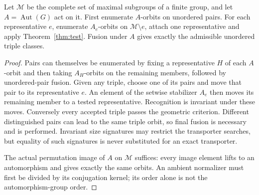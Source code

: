 \documentclass[11pt,a4paper]{article}
\newcommand{\Aut}{\operatorname{Aut}}\newcommand{\Stab}{\operatorname{Stab}}\newcommand{\cl}{\mathcal C}
\begin{document}
\begin{proposition}\label{prop:orbits}
Let $\mathcal M$ be the complete set of maximal subgroups of a finite group, and let $A=\Aut(G)$ act on it. First enumerate $A$-orbits on unordered pairs. For each representative $e$, enumerate $A_e$-orbits on $\mathcal M\setminus e$, attach one representative and apply Theorem~\ref{thm:test}. Fusion under $A$ gives exactly the admissible unordered triple classes.
\end{proposition}
\begin{proof}
Pairs can themselves be enumerated by fixing a representative $H$ of each $A$-orbit and then taking $A_H$-orbits on the remaining members, followed by unordered-pair fusion. Given any triple, choose one of its pairs and move that pair to its representative $e$. An element of the setwise stabilizer $A_e$ then moves its remaining member to a tested representative. Recognition is invariant under these moves. Conversely every accepted triple passes the geometric criterion. Different distinguished pairs can lead to the same triple orbit, so final fusion is necessary and is performed. Invariant size signatures may restrict the transporter searches, but equality of such signatures is never substituted for an exact transporter.

The actual permutation image of $A$ on $\mathcal M$ suffices: every image element lifts to an automorphism and gives exactly the same orbits. An ambient normalizer must first be divided by its conjugation kernel; its order alone is not the automorphism-group order.
\end{proof}
\end{document}
